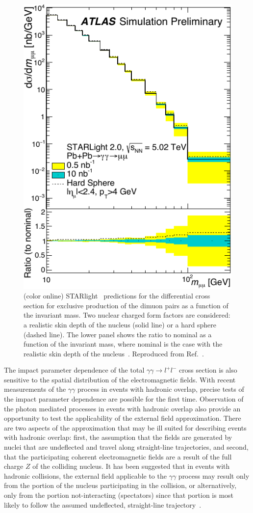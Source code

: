 \documentclass[twocolumn,epjc3]{svjour3}\sloppy
\begin{document}
\begin{figure}
  \centering
  \includegraphics[width=.4\textwidth]{fig/fig_8-crop.pdf}
  \caption{(color online) STARlight~\cite{kleinSTARlightMonteCarlo2017b} predictions for the differential cross section for exclusive production of the dimuon pairs as a function of the invariant mass. Two nuclear charged form factors are considered: a realistic skin depth of the nucleus (solid line) or a hard sphere (dashed line). The lower panel shows the ratio to nominal as a function of the invariant mass, where nominal is the case with the realistic skin depth of the nucleus~\cite{ProspectsMeasurementsPhotonInduced}. Reproduced from Ref.~\cite{ProspectsMeasurementsPhotonInduced}. }
  \label{fig:atlas_sim}
\end{figure}

The impact parameter dependence of the total $\gamma\gamma \rightarrow l^+l^-$ cross section is also sensitive to the spatial distribution of the electromagnetic fields. With recent measurements of the $\gamma\gamma$ process in events with hadronic overlap, precise tests of the impact parameter dependence are possible for the first time. Observation of the photon mediated processes in events with hadronic overlap also provide an opportunity to test the applicability of the external field approximation. There are two aspects of the approximation that may be ill suited for describing events with hadronic overlap: first, the assumption that the fields are generated by nuclei that are undeflected and travel along straight-line trajectories, and second, that the participating coherent electromagnetic fields are a result of the full charge $Z$ of the colliding nucleus. It has been suggested that in events with hadronic collisions, the external field applicable to the $\gamma\gamma$ process may result only from the portion of the nucleus participating in the collision, or alternatively, only from the portion not-interacting (spectators) since that portion is most likely to follow the assumed undeflected, straight-line trajectory~\cite{zhaCoherentEnsuremathPsi2018,starcollaborationObservationExcessPsi2019,alicecollaborationMeasurementExcessYield2016b}. 
\end{document}
